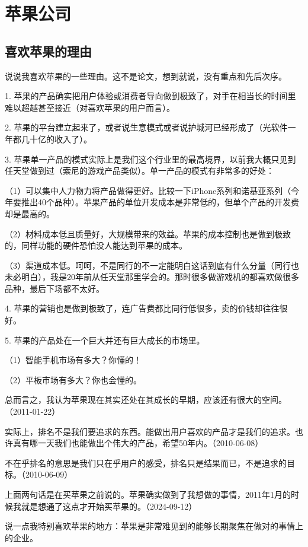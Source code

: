 
\section{苹果公司}

\subsection{喜欢苹果的理由}

说说我喜欢苹果的一些理由。这不是论文，想到就说，没有重点和先后次序。

1. 苹果的产品确实把用户体验或消费者导向做到极致了，对手在相当长的时间里难以超越甚至接近（对喜欢苹果的用户而言）。

2. 苹果的平台建立起来了，或者说生意模式或者说护城河已经形成了（光软件一年都几十亿的收入了）。

3. 苹果单一产品的模式实际上是我们这个行业里的最高境界，以前我大概只见到任天堂做到过（索尼的游戏产品类似）。单一产品的模式有非常多的好处：

（1）可以集中人力物力将产品做得更好。比较一下iPhone系列和诺基亚系列（今年要推出40个品种）。苹果产品的单位开发成本是非常低的，但单个产品的开发费却是最高的。

（2）材料成本低且质量好，大规模带来的效益。苹果的成本控制也是做到极致的，同样功能的硬件恐怕没人能达到苹果的成本。

（3）渠道成本低。呵呵，不是同行的不一定能明白这话到底有什么分量（同行也未必明白），我是20年前从任天堂那里学会的。那时很多做游戏机的都喜欢做很多品种，最后下场都不太好。

4. 苹果的营销也是做到极致了，连广告费都比同行低很多，卖的价钱却往往很好。

5. 苹果的产品处在一个巨大并还有巨大成长的市场里。

（1）智能手机市场有多大？你懂的！

（2）平板市场有多大？你也会懂的。

总而言之，我认为苹果现在其实还处在其成长的早期，应该还有很大的空间。（2011-01-22）

实际上，排名不是我们要追求的东西。能做出用户喜欢的产品才是我们的追求。也许真有哪一天我们也能做出个伟大的产品，希望50年内。（2010-06-08）

不在乎排名的意思是我们只在乎用户的感受，排名只是结果而已，不是追求的目标。（2010-06-09）

上面两句话是在买苹果之前说的。苹果确实做到了我想做的事情，2011年1月的时候我就是想通了这点才开始买苹果的。（2024-09-12）

说一点我特别喜欢苹果的地方：苹果是非常难见到的能够长期聚焦在做对的事情上的企业。

